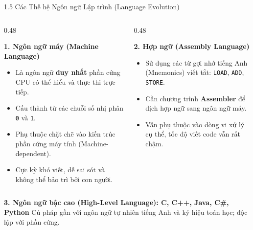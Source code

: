 \documentclass[aspectratio=169, 10pt]{beamer}
\begin{document}
\begin{frame}{1.5 Các Thế hệ Ngôn ngữ Lập trình (Language Evolution)}
  \begin{columns}[T]
    \begin{column}{0.48\textwidth}
      \begin{block}{\textbf{1. Ngôn ngữ máy (Machine Language)}}
        \begin{itemize}
          \item Là ngôn ngữ \textbf{duy nhất} phần cứng CPU có thể hiểu và thực thi trực tiếp.
          \item Cấu thành từ các chuỗi số nhị phân \texttt{0} và \texttt{1}.
          \item Phụ thuộc chặt chẽ vào kiến trúc phần cứng máy tính (Machine-dependent).
          \item Cực kỳ khó viết, dễ sai sót và không thể bảo trì bởi con người.
        \end{itemize}
      \end{block}
    \end{column}
    \begin{column}{0.48\textwidth}
      \begin{block}{\textbf{2. Hợp ngữ (Assembly Language)}}
        \begin{itemize}
          \item Sử dụng các từ gợi nhớ tiếng Anh (Mnemonics) viết tắt: \texttt{LOAD}, \texttt{ADD}, \texttt{STORE}.
          \item Cần chương trình \textbf{Assembler} để dịch hợp ngữ sang ngôn ngữ máy.
          \item Vẫn phụ thuộc vào dòng vi xử lý cụ thể, tốc độ viết code vẫn rất chậm.
        \end{itemize}
      \end{block}
    \end{column}
  \end{columns}
  \vskip 2mm
  \begin{exampleblock}{\textbf{3. Ngôn ngữ bậc cao (High-Level Language): C, C++, Java, C\#, Python}}
    Cú pháp gần với ngôn ngữ tự nhiên tiếng Anh và ký hiệu toán học; độc lập với phần cứng.
  \end{exampleblock}
\end{frame}
\end{document}
